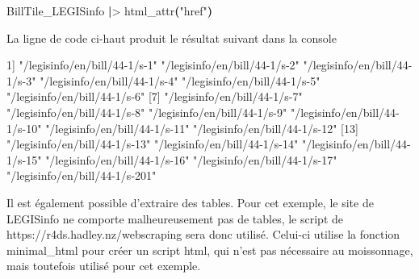 \documentclass[
  letterpaper,
  DIV=11,
  numbers=noendperiod]{scrreprt}
\newenvironment{Shaded}{\begin{snugshade}}{\end{snugshade}}
\newcommand{\ExtensionTok}[1]{\textcolor[rgb]{0.00,0.23,0.31}{#1}}
\newcommand{\KeywordTok}[1]{\textcolor[rgb]{0.00,0.23,0.31}{\textbf{#1}}}
\newcommand{\NormalTok}[1]{\textcolor[rgb]{0.00,0.23,0.31}{#1}}
\newcommand{\OperatorTok}[1]{\textcolor[rgb]{0.37,0.37,0.37}{#1}}
\newcommand{\StringTok}[1]{\textcolor[rgb]{0.13,0.47,0.30}{#1}}
\begin{document}
\begin{Shaded}
\begin{Highlighting}[]
\ExtensionTok{BillTile\_LEGISinfo} \KeywordTok{|}\OperatorTok{\textgreater{}}\NormalTok{ html\_attr}\KeywordTok{(}\StringTok{"href"}\KeywordTok{)}
\end{Highlighting}
\end{Shaded}

La ligne de code ci-haut produit le résultat suivant dans la console

\begin{Shaded}
\begin{Highlighting}[]
\ExtensionTok{1]} \StringTok{"/legisinfo/en/bill/44{-}1/s{-}1"}  
\StringTok{"/legisinfo/en/bill/44{-}1/s{-}2"} 
\StringTok{"/legisinfo/en/bill/44{-}1/s{-}3"}  
\StringTok{"/legisinfo/en/bill/44{-}1/s{-}4"}  
\StringTok{"/legisinfo/en/bill/44{-}1/s{-}5"}  
\StringTok{"/legisinfo/en/bill/44{-}1/s{-}6"}  
 \ExtensionTok{[7]} \StringTok{"/legisinfo/en/bill/44{-}1/s{-}7"} 
 \StringTok{"/legisinfo/en/bill/44{-}1/s{-}8"}  
 \StringTok{"/legisinfo/en/bill/44{-}1/s{-}9"}  
 \StringTok{"/legisinfo/en/bill/44{-}1/s{-}10"}  
 \StringTok{"/legisinfo/en/bill/44{-}1/s{-}11"} 
 \StringTok{"/legisinfo/en/bill/44{-}1/s{-}12"} 
\ExtensionTok{[13]} \StringTok{"/legisinfo/en/bill/44{-}1/s{-}13"} 
\StringTok{"/legisinfo/en/bill/44{-}1/s{-}14"} 
\StringTok{"/legisinfo/en/bill/44{-}1/s{-}15"}  
\StringTok{"/legisinfo/en/bill/44{-}1/s{-}16"} 
\StringTok{"/legisinfo/en/bill/44{-}1/s{-}17"} 
\StringTok{"/legisinfo/en/bill/44{-}1/s{-}201"}
\end{Highlighting}
\end{Shaded}

Il est également possible d'extraire des tables. Pour cet exemple, le
site de LEGISinfo ne comporte malheureusement pas de tables, le script
de https://r4ds.hadley.nz/webscraping sera donc utilisé. Celui-ci
utilise la fonction minimal\_html pour créer un script html, qui n'est
pas nécessaire au moissonnage, mais toutefois utilisé pour cet exemple.
\end{document}
